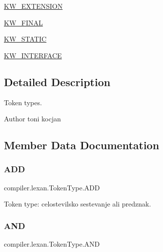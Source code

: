 \begin{DoxyCompactItemize}
\item 
\hyperlink{enumcompiler_1_1lexan_1_1_token_type_a5808c733aeac8c27c4294a1a11756247}{K\+W\+\_\+\+E\+X\+T\+E\+N\+S\+I\+ON}
\item 
\hyperlink{enumcompiler_1_1lexan_1_1_token_type_a71c42956a717db59a5f7b53cd9ae7892}{K\+W\+\_\+\+F\+I\+N\+AL}
\item 
\hyperlink{enumcompiler_1_1lexan_1_1_token_type_a8c2a6a293a40a34c3ee06191a3757873}{K\+W\+\_\+\+S\+T\+A\+T\+IC}
\item 
\hyperlink{enumcompiler_1_1lexan_1_1_token_type_ac65f70951810b93d8ad0feeeeeeb9e22}{K\+W\+\_\+\+I\+N\+T\+E\+R\+F\+A\+CE}
\end{DoxyCompactItemize}


\subsection{Detailed Description}
Token types.

\begin{DoxyAuthor}{Author}
toni kocjan 
\end{DoxyAuthor}


\subsection{Member Data Documentation}
\mbox{\label{enumcompiler_1_1lexan_1_1_token_type_ac70487c3c12fb69dd6a21d433f0a6b1f}} 
\subsubsection{\texorpdfstring{A\+DD}{ADD}}
{\footnotesize\ttfamily compiler.\+lexan.\+Token\+Type.\+A\+DD}

Token type\+: celostevilsko sestevanje ali predznak. \mbox{\label{enumcompiler_1_1lexan_1_1_token_type_a65f8ff9065ce3a4f0864dd386c19cbef}} 
\subsubsection{\texorpdfstring{A\+ND}{AND}}
{\footnotesize\ttfamily compiler.\+lexan.\+Token\+Type.\+A\+ND}

